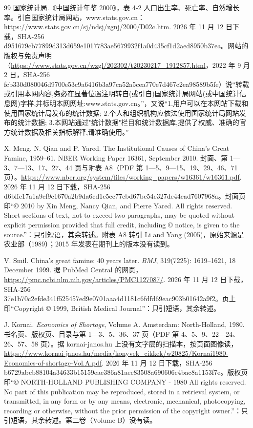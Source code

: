 \begin{thebibliography}{99}
 国家统计局.《中国统计年鉴 2000》，表 4-2 人口出生率、死亡率、自然增长率。引自国家统计局网站，www.stats.gov.cn：\url{https://www.stats.gov.cn/sj/ndsj/zgnj/2000/D02c.htm}. 2026 年 11 月 12 日下载，SHA-256 d951679cb77899d313d659e1017783ae5679932f1a0d435cf1d2aed8950b37ea。网站的版权与免责声明（\url{https://www.stats.gov.cn/wzgl/202302/t20230217_1912857.html}，2022 年 9 月 2 日，SHA-256 fcb330d080046d9700e53c9a6416b3a97ca52a5cea770e7d467c2ea98589b5fe）说“转载或引用本网内容,务必在显著位置注明转自(或引自)国家统计局网站(或中国统计信息网)字样,并标明本网网址:www.stats.gov.cn。”，又说“1.用户可以在本网站下载和使用国家统计局发布的统计数据; 2.个人和组织机构应依法使用国家统计局网站发布的统计数据; 3.本网站通过"统计数据"栏目和统计数据库,提供了权威、准确的官方统计数据及相关指标解释,请准确使用。”

 X. Meng, N. Qian and P. Yared. The Institutional Causes of China's Great Famine, 1959--61. NBER Working Paper 16361, September 2010. 封面、第 1—3、7—13、17、27、44 页与附表 A8（PDF 第 1—5、9—15、19、29、46、71 页）。\url{https://www.nber.org/system/files/working_papers/w16361/w16361.pdf}. 2026 年 11 月 12 日下载，SHA-256 d6bffc17a1a9cf9c1670a2b9da6cd1e5ec77cbd67be54c327de44ead7607968a。封面页印“© 2010 by Xin Meng, Nancy Qian, and Pierre Yared. All rights reserved. Short sections of text, not to exceed two paragraphs, may be quoted without explicit permission provided that full credit, including © notice, is given to the source.”：只引短语，其余转述。附表 A8 转引 Li and Yang (2005)，原始来源是农业部（1989）；2015 年发表在期刊上的版本没有读到。

 V. Smil. China's great famine: 40 years later. \emph{BMJ}, 319(7225): 1619--1621, 18 December 1999. 据 PubMed Central 的网页，\url{https://pmc.ncbi.nlm.nih.gov/articles/PMC1127087/}. 2026 年 11 月 12 日下载，SHA-256 37e1b70c2efde341f525457ed9e0701aaa4d1181c6fdfd69eac903b01642a9f2。页上印“Copyright © 1999, British Medical Journal”：只引短语，其余转述。

 J. Kornai. \emph{Economics of Shortage}, Volume A. Amsterdam: North-Holland, 1980. 书名页、版权页、目录与第 1—3、5、36、37 页（PDF 第 4、5、9、22—24、26、57、58 页）。据 kornai-janos.hu 上没有文字层的扫描本，按页面图像读，\url{https://www.kornai-janos.hu/media/konyvek_cikkek/w20825/Kornai1980-Economics-of-shortage-Vol.A.pdf}. 2026 年 11 月 12 日下载，SHA-256 b6729abcb88104a34633b15159eae386a81aec83508a690606c4bac8a1153f7e。版权页印“© NORTH-HOLLAND PUBLISHING COMPANY - 1980 All rights reserved. No part of this publication may be reproduced, stored in a retrieval system, or transmitted, in any form or by any means, electronic, mechanical, photocopying, recording or otherwise, without the prior permission of the copyright owner.”：只引短语，其余转述。第二卷（Volume B）没有读。


\end{thebibliography}
